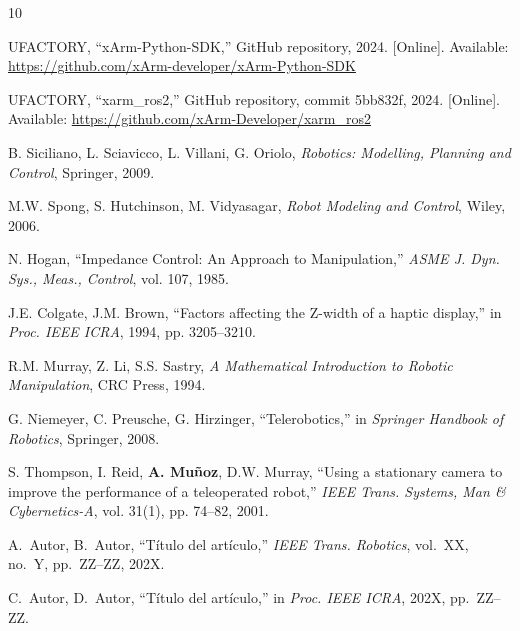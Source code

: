 \documentclass[journal,10pt,twoside]{IEEEtran}
\begin{document}
\begin{thebibliography}{10}

  UFACTORY, ``xArm-Python-SDK,''
  GitHub repository, 2024.
  [Online]. Available: \url{https://github.com/xArm-developer/xArm-Python-SDK}

  UFACTORY, ``xarm\_ros2,''
  GitHub repository, commit 5bb832f, 2024.
  [Online]. Available: \url{https://github.com/xArm-Developer/xarm_ros2}

  B. Siciliano, L. Sciavicco, L. Villani, G. Oriolo,
  \textit{Robotics: Modelling, Planning and Control},
  Springer, 2009.

  M.W. Spong, S. Hutchinson, M. Vidyasagar,
  \textit{Robot Modeling and Control},
  Wiley, 2006.

  N. Hogan,
  ``Impedance Control: An Approach to Manipulation,''
  \textit{ASME J. Dyn. Sys., Meas., Control},
  vol. 107, 1985.

  J.E. Colgate, J.M. Brown,
  ``Factors affecting the Z-width of a haptic display,''
  in \textit{Proc. IEEE ICRA}, 1994, pp. 3205--3210.

  R.M. Murray, Z. Li, S.S. Sastry,
  \textit{A Mathematical Introduction to Robotic Manipulation},
  CRC Press, 1994.

  G. Niemeyer, C. Preusche, G. Hirzinger,
  ``Telerobotics,''
  in \textit{Springer Handbook of Robotics},
  Springer, 2008.

  S. Thompson, I. Reid, \textbf{A. Muñoz}, D.W. Murray,
  ``Using a stationary camera to improve the performance
  of a teleoperated robot,''
  \textit{IEEE Trans. Systems, Man \& Cybernetics-A},
  vol. 31(1), pp. 74--82, 2001.

  A.~Autor, B.~Autor, ``Título del artículo,''
  \textit{IEEE Trans. Robotics}, vol.~XX, no.~Y, pp.~ZZ--ZZ, 202X.

  C.~Autor, D.~Autor, ``Título del artículo,''
  in \textit{Proc. IEEE ICRA}, 202X, pp.~ZZ--ZZ.

\end{thebibliography}
\end{document}

